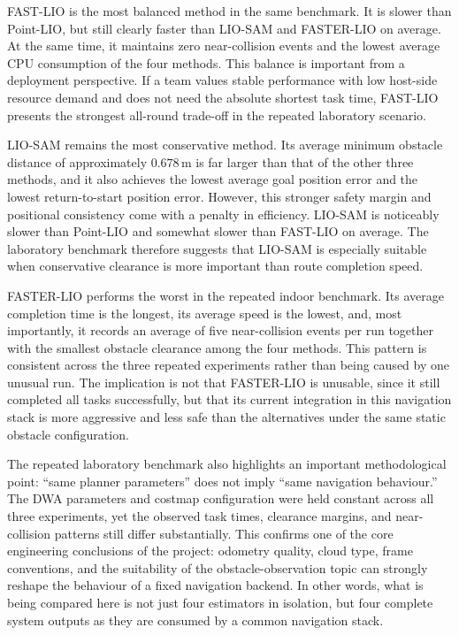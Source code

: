 \documentclass[12pt,a4paper]{report}
\begin{document}
FAST-LIO is the most balanced method in the same benchmark. It is slower than Point-LIO, but still clearly faster than LIO-SAM and FASTER-LIO on average. At the same time, it maintains zero near-collision events and the lowest average CPU consumption of the four methods. This balance is important from a deployment perspective. If a team values stable performance with low host-side resource demand and does not need the absolute shortest task time, FAST-LIO presents the strongest all-round trade-off in the repeated laboratory scenario.

LIO-SAM remains the most conservative method. Its average minimum obstacle distance of approximately \(0.678\,\mathrm{m}\) is far larger than that of the other three methods, and it also achieves the lowest average goal position error and the lowest return-to-start position error. However, this stronger safety margin and positional consistency come with a penalty in efficiency. LIO-SAM is noticeably slower than Point-LIO and somewhat slower than FAST-LIO on average. The laboratory benchmark therefore suggests that LIO-SAM is especially suitable when conservative clearance is more important than route completion speed.

FASTER-LIO performs the worst in the repeated indoor benchmark. Its average completion time is the longest, its average speed is the lowest, and, most importantly, it records an average of five near-collision events per run together with the smallest obstacle clearance among the four methods. This pattern is consistent across the three repeated experiments rather than being caused by one unusual run. The implication is not that FASTER-LIO is unusable, since it still completed all tasks successfully, but that its current integration in this navigation stack is more aggressive and less safe than the alternatives under the same static obstacle configuration.

The repeated laboratory benchmark also highlights an important methodological point: ``same planner parameters'' does not imply ``same navigation behaviour.'' The DWA parameters and costmap configuration were held constant across all three experiments, yet the observed task times, clearance margins, and near-collision patterns still differ substantially. This confirms one of the core engineering conclusions of the project: odometry quality, cloud type, frame conventions, and the suitability of the obstacle-observation topic can strongly reshape the behaviour of a fixed navigation backend. In other words, what is being compared here is not just four estimators in isolation, but four complete system outputs as they are consumed by a common navigation stack.
\end{document}
